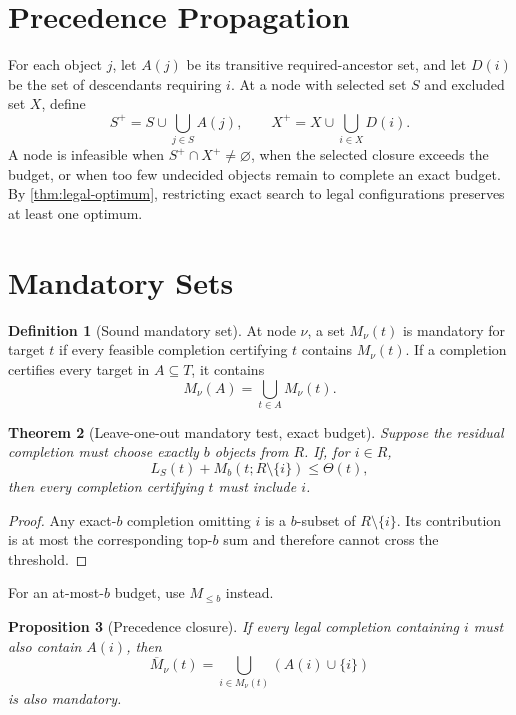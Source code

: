 \documentclass[11pt]{article}
\newtheorem{theorem}{Theorem}[section]
\newtheorem{proposition}[theorem]{Proposition}
\theoremstyle{definition}
\newtheorem{definition}[theorem]{Definition}
\theoremstyle{remark}
\begin{document}
\section{Precedence Propagation}

For each object $j$, let $A(j)$ be its transitive required-ancestor set, and let $D(i)$ be the set of descendants requiring $i$. At a node with selected set $S$ and excluded set $X$, define
\[
S^+=S\cup\bigcup_{j\in S}A(j),
\qquad
X^+=X\cup\bigcup_{i\in X}D(i).
\]
A node is infeasible when $S^+\cap X^+\ne\varnothing$, when the selected closure exceeds the budget, or when too few undecided objects remain to complete an exact budget. By \cref{thm:legal-optimum}, restricting exact search to legal configurations preserves at least one optimum.

\section{Mandatory Sets}

\begin{definition}[Sound mandatory set]\label{def:mandatory}
At node $\nu$, a set $M_\nu(t)$ is mandatory for target $t$ if every feasible completion certifying $t$ contains $M_\nu(t)$. If a completion certifies every target in $A\subseteq T$, it contains
\[
M_\nu(A)=\bigcup_{t\in A}M_\nu(t).
\]
\end{definition}

\begin{theorem}[Leave-one-out mandatory test, exact budget]\label{thm:leave-one-out}
Suppose the residual completion must choose exactly $b$ objects from $R$. If, for $i\in R$,
\[
L_S(t)+M_b(t;R\setminus\{i\})\le\Theta(t),
\]
then every completion certifying $t$ must include $i$.
\end{theorem}

\begin{proof}
Any exact-$b$ completion omitting $i$ is a $b$-subset of $R\setminus\{i\}$. Its contribution is at most the corresponding top-$b$ sum and therefore cannot cross the threshold.
\end{proof}

For an at-most-$b$ budget, use $M_{\le b}$ instead.

\begin{proposition}[Precedence closure]\label{prop:mandatory-closure}
If every legal completion containing $i$ must also contain $A(i)$, then
\[
\overline M_\nu(t)
=
\bigcup_{i\in M_\nu(t)}(A(i)\cup\{i\})
\]
is also mandatory.
\end{proposition}
\end{document}
